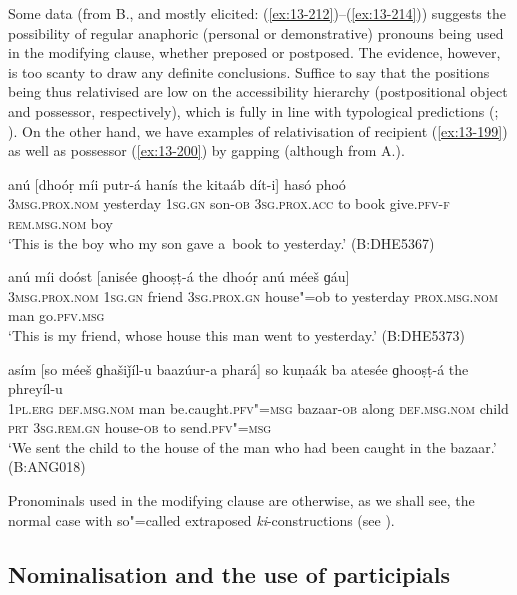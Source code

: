 Some data (from B., and mostly elicited: (\ref{ex:13-212})--(\ref{ex:13-214})) suggests the possibility of regular anaphoric (personal or demonstrative) pronouns being used in the modifying clause, whether preposed or postposed. The evidence, however, is too scanty to draw any definite conclusions. Suffice to say that the positions being thus relativised are low on the accessibility hierarchy (postpositional object and possessor, respectively), which is fully in line with typological predictions (\citealt[147--148]{keenan1985}; \citealt[226]{andrews_relative2007}). On the other hand, we have examples of relativisation of recipient (\ref{ex:13-199}) as well as possessor (\ref{ex:13-200}) by gapping (although from A.).

\begin{exe}
\ex
\label{ex:13-212}
\gll anú [dhoóṛ míi putr-á hanís the  kitaáb dít-i] hasó phoó  \\
\textsc{3msg.prox.nom} yesterday \textsc{1sg.gn} son-\textsc{ob} \textsc{3sg.prox.acc} to  book give.\textsc{pfv-f} \textsc{rem.msg.nom} boy \\
\glt `This is the boy who my son gave a~book to yesterday.' (B:DHE5367)

\ex
\label{ex:13-213}
\gll anú míi doóst [anisée ɡhooṣṭ-á the  dhoóṛ anú méeš ɡáu] \\
\textsc{3msg.prox.nom} \textsc{1sg.gn} friend \textsc{3sg.prox.gn} house"=ob to  yesterday \textsc{prox.msg.nom} man go.\textsc{pfv.msg} \\
\glt `This is my friend, whose house this man went to yesterday.' (B:DHE5373)

\ex
\label{ex:13-214}
\gll asím [so méeš ɡhašiǰíl-u baazúur-a  phará] so kuṇaák ba atesée
ɡhooṣṭ-á  the phreyíl-u \\
\textsc{1pl.erg} \textsc{def.msg.nom} man be.caught.\textsc{pfv"=msg} bazaar-\textsc{ob}  along \textsc{ def.msg.nom} child \textsc{prt} \textsc{3sg.rem.gn} house-\textsc{ob} to send.\textsc{pfv"=msg} \\
\glt `We sent the child to the house of the man who had been caught in the bazaar.' (B:ANG018) 
\end{exe}

Pronominals used in the modifying clause are otherwise, as we shall see, the normal case with so"=called extraposed \textit{ki}-constructions (see ). 


\subsection{Nominalisation and the use of participials}
\label{subsec:13-6-6}

